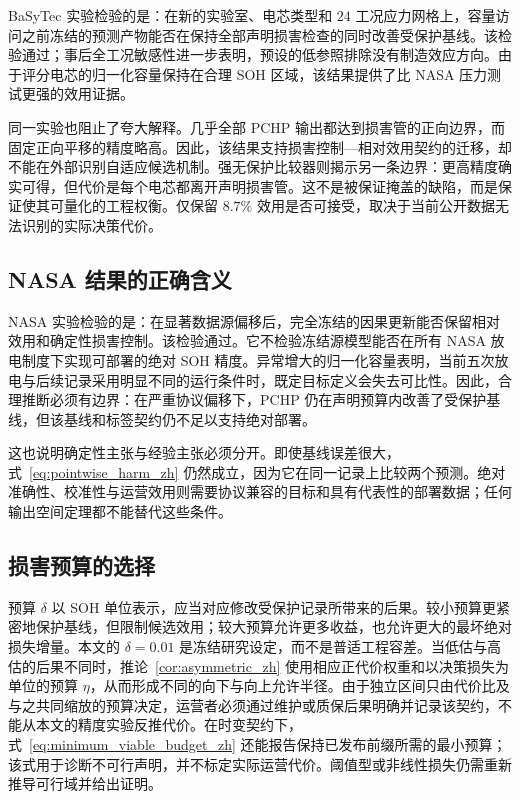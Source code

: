 \documentclass[UTF8,11pt]{ctexart}
\begin{document}
BaSyTec 实验检验的是：在新的实验室、电芯类型和 $24$ 工况应力网格上，容量访问之前冻结的预测产物能否在保持全部声明损害检查的同时改善受保护基线。该检验通过；事后全工况敏感性进一步表明，预设的低参照排除没有制造效应方向。由于评分电芯的归一化容量保持在合理 SOH 区域，该结果提供了比 NASA 压力测试更强的效用证据。

同一实验也阻止了夸大解释。几乎全部 PCHP 输出都达到损害管的正向边界，而固定正向平移的精度略高。因此，该结果支持损害控制—相对效用契约的迁移，却不能在外部识别自适应候选机制。强无保护比较器则揭示另一条边界：更高精度确实可得，但代价是每个电芯都离开声明损害管。这不是被保证掩盖的缺陷，而是保证使其可量化的工程权衡。仅保留 $8.7\%$ 效用是否可接受，取决于当前公开数据无法识别的实际决策代价。

\subsection{NASA 结果的正确含义}

NASA 实验检验的是：在显著数据源偏移后，完全冻结的因果更新能否保留相对效用和确定性损害控制。该检验通过。它不检验冻结源模型能否在所有 NASA 放电制度下实现可部署的绝对 SOH 精度。异常增大的归一化容量表明，当前五次放电与后续记录采用明显不同的运行条件时，既定目标定义会失去可比性。因此，合理推断必须有边界：在严重协议偏移下，PCHP 仍在声明预算内改善了受保护基线，但该基线和标签契约仍不足以支持绝对部署。

这也说明确定性主张与经验主张必须分开。即使基线误差很大，式~\eqref{eq:pointwise_harm_zh} 仍然成立，因为它在同一记录上比较两个预测。绝对准确性、校准性与运营效用则需要协议兼容的目标和具有代表性的部署数据；任何输出空间定理都不能替代这些条件。

\subsection{损害预算的选择}

预算 $\delta$ 以 SOH 单位表示，应当对应修改受保护记录所带来的后果。较小预算更紧密地保护基线，但限制候选效用；较大预算允许更多收益，也允许更大的最坏绝对损失增量。本文的 $\delta=0.01$ 是冻结研究设定，而不是普适工程容差。当低估与高估的后果不同时，推论~\ref{cor:asymmetric_zh} 使用相应正代价权重和以决策损失为单位的预算 $\eta$，从而形成不同的向下与向上允许半径。由于独立区间只由代价比及与之共同缩放的预算决定，运营者必须通过维护或质保后果明确并记录该契约，不能从本文的精度实验反推代价。在时变契约下，式~\eqref{eq:minimum_viable_budget_zh} 还能报告保持已发布前缀所需的最小预算；该式用于诊断不可行声明，并不标定实际运营代价。阈值型或非线性损失仍需重新推导可行域并给出证明。
\end{document}
